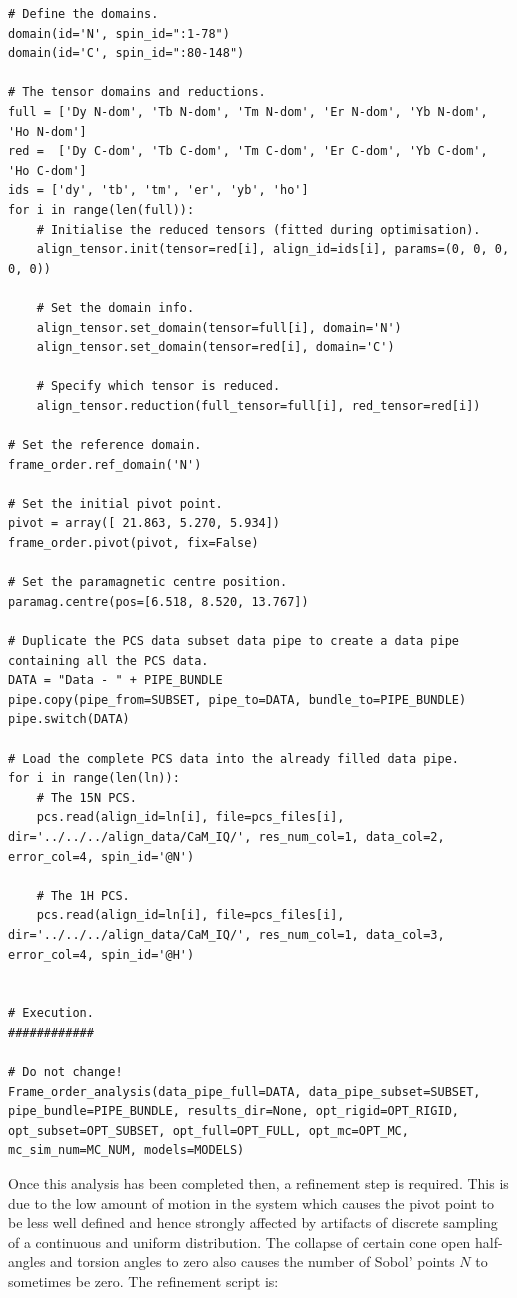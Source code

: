 \begin{lstlisting}
# Define the domains.
domain(id='N', spin_id=":1-78")
domain(id='C', spin_id=":80-148")

# The tensor domains and reductions.
full = ['Dy N-dom', 'Tb N-dom', 'Tm N-dom', 'Er N-dom', 'Yb N-dom', 'Ho N-dom']
red =  ['Dy C-dom', 'Tb C-dom', 'Tm C-dom', 'Er C-dom', 'Yb C-dom', 'Ho C-dom']
ids = ['dy', 'tb', 'tm', 'er', 'yb', 'ho']
for i in range(len(full)):
    # Initialise the reduced tensors (fitted during optimisation).
    align_tensor.init(tensor=red[i], align_id=ids[i], params=(0, 0, 0, 0, 0))

    # Set the domain info.
    align_tensor.set_domain(tensor=full[i], domain='N')
    align_tensor.set_domain(tensor=red[i], domain='C')

    # Specify which tensor is reduced.
    align_tensor.reduction(full_tensor=full[i], red_tensor=red[i])

# Set the reference domain.
frame_order.ref_domain('N')

# Set the initial pivot point.
pivot = array([ 21.863, 5.270, 5.934])
frame_order.pivot(pivot, fix=False)

# Set the paramagnetic centre position.
paramag.centre(pos=[6.518, 8.520, 13.767])

# Duplicate the PCS data subset data pipe to create a data pipe containing all the PCS data.
DATA = "Data - " + PIPE_BUNDLE
pipe.copy(pipe_from=SUBSET, pipe_to=DATA, bundle_to=PIPE_BUNDLE)
pipe.switch(DATA)

# Load the complete PCS data into the already filled data pipe.
for i in range(len(ln)):
    # The 15N PCS.
    pcs.read(align_id=ln[i], file=pcs_files[i], dir='../../../align_data/CaM_IQ/', res_num_col=1, data_col=2, error_col=4, spin_id='@N')

    # The 1H PCS.
    pcs.read(align_id=ln[i], file=pcs_files[i], dir='../../../align_data/CaM_IQ/', res_num_col=1, data_col=3, error_col=4, spin_id='@H')


# Execution.
############

# Do not change!
Frame_order_analysis(data_pipe_full=DATA, data_pipe_subset=SUBSET, pipe_bundle=PIPE_BUNDLE, results_dir=None, opt_rigid=OPT_RIGID, opt_subset=OPT_SUBSET, opt_full=OPT_FULL, opt_mc=OPT_MC, mc_sim_num=MC_NUM, models=MODELS)
\end{lstlisting}

Once this analysis has been completed then, a refinement step is required.
This is due to the low amount of motion in the system which causes the pivot point to be less well defined and hence strongly affected by artifacts of discrete sampling of a continuous and uniform distribution.
The collapse of certain cone open half-angles and torsion angles to zero also causes the number of Sobol' points $N$ to sometimes be zero.
The refinement script is:

